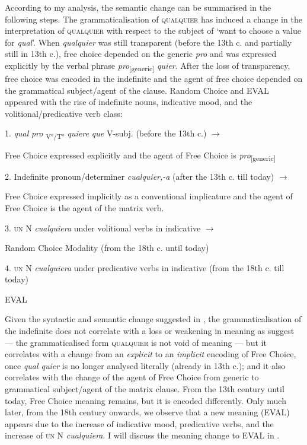     \citep[2]{am2018}
\z
\z

According to my analysis, the semantic change can be summarised in the following steps. The grammaticalisation of \textsc{qualquier} has induced a change in the interpretation of \textsc{qualquier} with respect to the subject of ‘want to choose a value for \textit{qual}’. When \textit{qualquier} was still transparent (before the 13th c. and partially still in 13th c.), free choice depended on the generic \textit{pro} and was expressed explicitly by the verbal phrase \textit{pro}\textsubscript{[generic]} \textit{quier}. After the loss of transparency, free choice was encoded in the indefinite and the agent of free choice depended on the grammatical subject/agent of the clause. Random Choice and EVAL appeared with the rise of indefinite nouns, indicative mood, and the volitional/predicative verb class:

\newpage
\ea \label{ex:key:316} %
  1.  \textit{qual} \textit{pro} \textsubscript{V°/T°} \textit{quiere que} V-subj. (before the 13th c.) $\rightarrow$

    Free Choice expressed explicitly and the agent of Free Choice is \textit{pro}\textsubscript{[generic]}

{} 2.{  Indefinite pronoun/determiner} {\textit{cualquier,-a}}{ (after the 13th c. till today) $\rightarrow$}

{    Free Choice expressed} {{implicitly}}{ as a conventional implicature and the agent of Free Choice is the agent of the matrix verb.}

  3.  \textsc{un} N \textit{cualquiera} under volitional verbs in indicative $\rightarrow$

{    Random Choice Modality (from the 18th c. until today)}

  4.  \textsc{un} N \textit{cualquiera} under predicative verbs in indicative (from the 18th c. till today)

EVAL
\z

Given the syntactic and semantic change suggested in , the grammaticalisation of the indefinite does not correlate with a loss or weakening in meaning as \citet{cp2009} suggest — the grammaticalised form \textsc{qualquier} is not void of meaning — but it correlates with a change from an \textit{explicit} to an \textit{implicit} encoding of Free Choice, once \textit{qual quier} is no longer analysed literally (already in 13th c.); and it also correlates with the change of the agent of Free Choice from generic to grammatical subject/agent of the matrix clause. From the 13th century until today, Free Choice meaning remains, but it is encoded differently. Only much later, from the 18th century onwards, we observe that a {new meaning} (EVAL) appears due to the increase of indicative mood, predicative verbs, and the increase of \textsc{un} N \textit{cualquiera}. I will discuss the meaning change to EVAL in .

